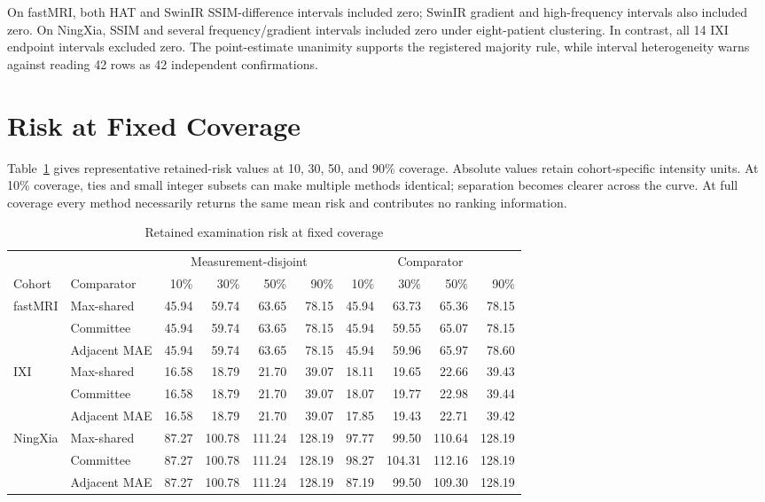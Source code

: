 \documentclass[journal,10pt]{IEEEtran}
\begin{document}
On fastMRI, both HAT and SwinIR SSIM-difference intervals included zero; SwinIR gradient and high-frequency intervals also included zero. On NingXia, SSIM and several frequency/gradient intervals included zero under eight-patient clustering. In contrast, all 14 IXI endpoint intervals excluded zero. The point-estimate unanimity supports the registered majority rule, while interval heterogeneity warns against reading 42 rows as 42 independent confirmations.

\section{Risk at Fixed Coverage}
Table~\ref{tab:coverage} gives representative retained-risk values at 10, 30, 50, and 90\% coverage. Absolute values retain cohort-specific intensity units. At 10\% coverage, ties and small integer subsets can make multiple methods identical; separation becomes clearer across the curve. At full coverage every method necessarily returns the same mean risk and contributes no ranking information.

\begin{table}[t]
\caption{Retained examination risk at fixed coverage}
\label{tab:coverage}\centering
\begin{tabular}{llrrrr@{\qquad}rrrr}
\toprule
&&\multicolumn{4}{c}{Measurement-disjoint}&\multicolumn{4}{c}{Comparator}\\
Cohort&Comparator&10\%&30\%&50\%&90\%&10\%&30\%&50\%&90\%\\
\midrule
fastMRI&Max-shared&45.94&59.74&63.65&78.15&45.94&63.73&65.36&78.15\\
&Committee&45.94&59.74&63.65&78.15&45.94&59.55&65.07&78.15\\
&Adjacent MAE&45.94&59.74&63.65&78.15&45.94&59.96&65.97&78.60\\
IXI&Max-shared&16.58&18.79&21.70&39.07&18.11&19.65&22.66&39.43\\
&Committee&16.58&18.79&21.70&39.07&18.07&19.77&22.98&39.44\\
&Adjacent MAE&16.58&18.79&21.70&39.07&17.85&19.43&22.71&39.42\\
NingXia&Max-shared&87.27&100.78&111.24&128.19&97.77&99.50&110.64&128.19\\
&Committee&87.27&100.78&111.24&128.19&98.27&104.31&112.16&128.19\\
&Adjacent MAE&87.27&100.78&111.24&128.19&87.19&99.50&109.30&128.19\\
\bottomrule
\end{tabular}
\end{table}
\end{document}
